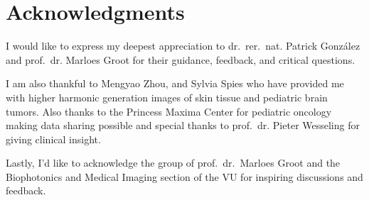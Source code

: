\section*{Acknowledgments}
I would like to express my deepest appreciation to dr.\ rer.\ nat. Patrick González and prof.\ dr. Marloes Groot for their guidance, feedback, and critical questions.

I am also thankful to Mengyao Zhou, and Sylvia Spies who have provided me with higher harmonic generation images of skin tissue and pediatric brain tumors.
Also thanks to the Princess Maxima Center for pediatric oncology making data sharing possible and special thanks to prof.\ dr. Pieter Wesseling for giving clinical insight.

Lastly, I'd like to acknowledge the group of prof.\ dr.\ Marloes Groot and the Biophotonics and Medical Imaging section of the VU for inspiring discussions and feedback.
